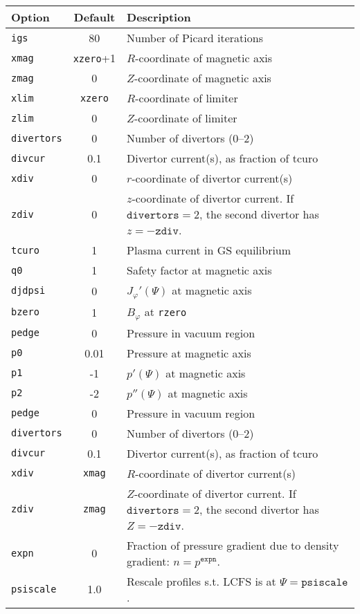 \documentclass[letterpaper]{book}
\newcommand{\tor}{\varphi}              %
\begin{document}
\begin{tabular}{lcp{3in}}
  \textbf{Option}&\textbf{Default}&\textbf{Description}\\
  \hline
  \texttt{igs}   & 80     & Number of Picard iterations\\
  \texttt{xmag}  & \texttt{xzero}+1 & $R$-coordinate of magnetic axis\\
  \texttt{zmag}  & 0      & $Z$-coordinate of magnetic axis\\
  \texttt{xlim}  & \texttt{xzero}   & $R$-coordinate of limiter\\
  \texttt{zlim}  & 0      & $Z$-coordinate of limiter\\
  \hline
  \texttt{divertors} & 0  & Number of divertors (0--2)\\
  \texttt{divcur}& 0.1    & Divertor current(s), as fraction of tcuro\\
  \texttt{xdiv}  & 0      & $r$-coordinate of divertor current(s)\\
  \texttt{zdiv}  & 0      & \parbox[t]{3in}{$z$-coordinate of 
    divertor 
    current.  If $\mathtt{divertors} = 2$, the second divertor has 
    $z = -\mathtt{zdiv}$.}\\
  \hline
  \texttt{tcuro} & 1      & Plasma current in GS equilibrium\\
  \texttt{q0}    & 1      & Safety factor at magnetic axis\\
  \texttt{djdpsi}& 0      & $J_\tor'(\Psi)$ at magnetic axis\\
  \texttt{bzero} & 1      & $B_\tor$ at \texttt{rzero}\\
  \texttt{pedge} & 0      & Pressure in vacuum region\\
  \texttt{p0}    & 0.01   & Pressure at magnetic axis\\
  \texttt{p1}    & -1     & $p'(\Psi)$ at magnetic axis\\
  \texttt{p2}    & -2     & $p''(\Psi)$ at magnetic axis\\
  \texttt{pedge} & 0      & Pressure in vacuum region\\
  \texttt{divertors} & 0  & Number of divertors (0--2)\\
  \texttt{divcur}& 0.1    & Divertor current(s), as fraction of tcuro\\
  \texttt{xdiv}  & \texttt{xmag} & $R$-coordinate of divertor current(s)\\
  \texttt{zdiv}  & \texttt{zmag} & \parbox[t]{3in}{$Z$-coordinate of 
    divertor 
    current.  If $\mathtt{divertors} = 2$, the second divertor has 
    $Z = -\mathtt{zdiv}$.}\\
  \texttt{expn}  & 0 & \parbox[t]{3in}{Fraction of pressure gradient due to
    density gradient: $n = p^\mathtt{expn}$.}\\
  \texttt{psiscale} & 1.0 & Rescale profiles s.t. LCFS is at 
  $\Psi=\mathtt{psiscale}$.
\end{tabular}
\end{document}
